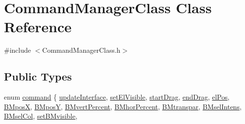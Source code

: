 \hypertarget{class_command_manager_class}{}\section{Command\+Manager\+Class Class Reference}
\label{class_command_manager_class}


{\ttfamily \#include $<$Command\+Manager\+Class.\+h$>$}

\subsection*{Public Types}
\begin{DoxyCompactItemize}
\item 
enum \hyperlink{class_command_manager_class_aff5b4b6301c24b585b22c6abaf4f3131}{command} \{ \newline
\hyperlink{class_command_manager_class_aff5b4b6301c24b585b22c6abaf4f3131a019a9a504305af95297c38cd882a6476}{update\+Interface}, 
\hyperlink{class_command_manager_class_aff5b4b6301c24b585b22c6abaf4f3131acbf12d86b0e9bb15a5e33fb4452b7545}{set\+El\+Visible}, 
\hyperlink{class_command_manager_class_aff5b4b6301c24b585b22c6abaf4f3131a675a093342f5cab9143833719416b1ca}{start\+Drag}, 
\hyperlink{class_command_manager_class_aff5b4b6301c24b585b22c6abaf4f3131ad0391bbcf5bc01414a8910132b6b81c3}{end\+Drag}, 
\newline
\hyperlink{class_command_manager_class_aff5b4b6301c24b585b22c6abaf4f3131a89eafb79ccbfe63eaa6b6e97602b2ae3}{el\+Pos}, 
\hyperlink{class_command_manager_class_aff5b4b6301c24b585b22c6abaf4f3131addc1ebb2eaef52d890f0b0ed7c02ad48}{B\+MposX}, 
\hyperlink{class_command_manager_class_aff5b4b6301c24b585b22c6abaf4f3131a03c77f6ff1cadb2edee8b557352608b5}{B\+MposY}, 
\hyperlink{class_command_manager_class_aff5b4b6301c24b585b22c6abaf4f3131a48fc2d4040ea5ff550c7115162356e09}{B\+Mvert\+Percent}, 
\newline
\hyperlink{class_command_manager_class_aff5b4b6301c24b585b22c6abaf4f3131a9ad273d625da529cacc7b14413b4bd75}{B\+Mhor\+Percent}, 
\hyperlink{class_command_manager_class_aff5b4b6301c24b585b22c6abaf4f3131af9d4084ebea4b1afb35c1b6265195e2c}{B\+Mtranspar}, 
\hyperlink{class_command_manager_class_aff5b4b6301c24b585b22c6abaf4f3131a047590cf2e1b9f7e59e94efd19106afd}{B\+Msel\+Intens}, 
\hyperlink{class_command_manager_class_aff5b4b6301c24b585b22c6abaf4f3131a9efe57d5493f1463c91d71ad8d2ccf8f}{B\+Msel\+Col}, 
\newline
\hyperlink{class_command_manager_class_aff5b4b6301c24b585b22c6abaf4f3131ac8dd9217e83c6b6e25426d7f1c1c50fd}{set\+B\+Mvisible}, 

\end{DoxyCompactItemize}
